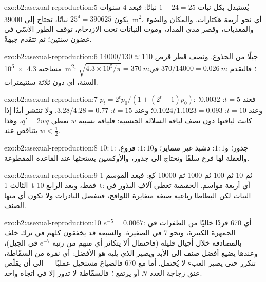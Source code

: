 \begin{solution}{exo:b2:asexual-reproduction:5}
يُستبدل بكل نبات $1 + 24 = 25$ نباتًا: فبعد 4 سنوات يكون $25^{4} =
\num{390625}$ نباتًا، تحتاج إلى \qty{39000}{m^2}، أي نحو أربعة هكتارات.
والمكان والضوء والمغذيات، وقصر مدى المداد، وموت النباتات تحت
الازدحام، توقف الطور الأسّي في غضون سنتين؛ ثم تتقدم  جبهةً.
\end{solution}

\begin{solution}{exo:b2:asexual-reproduction:6}
$\num{14000}/130 \approx 110$ جيلًا من الجذوع. ونصف قطر قرص
مساحته \qty{4.3e5}{m^2}: $\sqrt{4.3\times 10^{5}/\pi} = \qty{370}{m}$؛
فالتقدم $370/\num{14000} = \qty{0.026}{m}$ في السنة، أي دون ثلاثة
سنتيمترات.
\end{solution}

\begin{solution}{exo:b2:asexual-reproduction:7}
$p_t = 2^{t}p_0/(1 + (2^{t} - 1)p_0)$: فعند $t = 5$: $0.0032$؛ وعند $t = 10$:
$0.1024/1.1023 = 0.093$؛ وعند $t = 15$: $3.28/4.28 = 0.77$. ولا تنتشر
أبدًا إذا كانت لياقتها دون نصف لياقة السلالة الجنسية: فلياقة
نسبية $w$ تعطي $q' = 2wq$، وهذا يتناقص عند $w <
\tfrac12$.
\end{solution}

\begin{solution}{exo:b2:asexual-reproduction:8}
$10 : 1$: جذور؛ و$1 : 1$: دشبذ غير متمايز؛ و$1 : 10$: فروع.
والعقلة لها فرع سلفًا وتحتاج إلى جذور، والأوكسين يستحثها
عند القاعدة المقطوعة.
\end{solution}

\begin{solution}{exo:b2:asexual-reproduction:9}
1 ثم 10 ثم 100 ثم \num{1000} ثم \num{10000} كغ: فبعد الموسم الثالث
\qty{1}{t} فقط، وبعد الرابع \qty{10}{t}: أي أربعة مواسم. 
الحقيقية تعطي آلاف البذور في النبات لكن البطاطا رباعية صيغة متغايرة
اللواقح، فتنفصل البادرات ولا تكون أي منها الصنف.
\end{solution}

\begin{solution}{exo:b2:asexual-reproduction:10}
$e^{-5} = 0.0067$: أي 670 فردًا خاليًا من الطفرات في الجمهرة
الكبيرة، ونحو 7 في الصغيرة. والسبعة قد يخفقون كلهم في
ترك خلف بالمصادفة خلال أجيال قليلة (فاحتمال ألا يتكاثر أي
منهم من رتبة $e^{-7}$ في الجيل)، وعندها يضيع أفضل صنف إلى الأبد
ويصير الذي يليه هو الأفضل: أي نقرة من السقّاطة، تتكرر حتى
يصير العبء لا يُحتمل. أما مع 670 فالضياع مستحيل عمليًا
--- إلى أن يقلّص عنق زجاجة العدد $N$ أو يرتفع ؛
فالسقّاطة لا تدور إلا في اتجاه واحد.
\end{solution}

